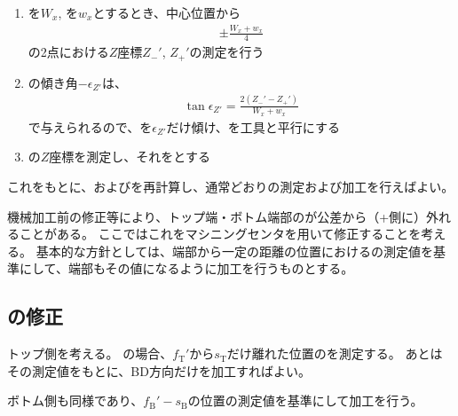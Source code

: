 \begin{enumerate}[label=\sarrow]
\item \ACOD を$W_x$, \TopEndACID を$w_x$とするとき、中心位置から
\begin{align*}
  \pm\frac{W_x+w_x}4
\end{align*}
の2点における$Z$座標$Z_-'$, $Z_+'$の測定を行う
\item \TopEndFace の傾き角$-\epsilon_{Z'}$は、
\begin{align*}
  \tan\epsilon_{Z'} = \frac{2(Z_-'-Z_+')}{W_x+w_x}
\end{align*}
で与えられるので、\Table を$\epsilon_{Z'}$だけ傾け、\TopEndFace を工具と平行にする
\item \TopEndFace の$Z$座標を測定し、それを\TopAlocationLength とする
\end{enumerate}
これをもとに、\AlocationAngle および\DimpleAngle を再計算し、通常どおり\Dimple の測定および加工を行えばよい。



\clearpage
機械加工前の修正等により、トップ端・ボトム端部の\OuterDiameter が公差から（+側に）外れることがある。
ここではこれをマシニングセンタを用いて修正することを考える。
基本的な方針としては、端部から一定の距離の位置における\OuterDiameter の測定値を基準にして、端部もその値になるように加工を行うものとする。


\subsection{\BDOD の修正}
トップ側を考える。
\BDOD の場合、\TopReAlocationLength$f_\mathrm T'$から$s_\mathrm T$だけ離れた位置の\BDOD を測定する。
あとはその測定値をもとに、BD方向だけを加工すればよい。

ボトム側も同様であり、$f_\mathrm B'-s_\mathrm B$の位置の測定値を基準にして加工を行う。


